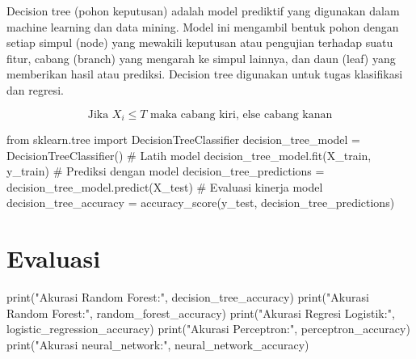 \documentclass[
  letterpaper,
]{krantz}
\makeatletter
\newenvironment{Shaded}{\begin{snugshade}}{\end{snugshade}}
\newcommand{\BuiltInTok}[1]{\textcolor[rgb]{0.00,0.23,0.31}{#1}}
\newcommand{\CommentTok}[1]{\textcolor[rgb]{0.37,0.37,0.37}{#1}}
\newcommand{\ImportTok}[1]{\textcolor[rgb]{0.00,0.46,0.62}{#1}}
\newcommand{\NormalTok}[1]{\textcolor[rgb]{0.00,0.23,0.31}{#1}}
\newcommand{\OperatorTok}[1]{\textcolor[rgb]{0.37,0.37,0.37}{#1}}
\newcommand{\StringTok}[1]{\textcolor[rgb]{0.13,0.47,0.30}{#1}}
\newenvironment{kframe}{%
\medskip{}
\setlength{\fboxsep}{.8em}
 \def\at@end@of@kframe{}%
 \ifinner\ifhmode%
  \def\at@end@of@kframe{\end{minipage}}%
  \begin{minipage}{\columnwidth}%
 \fi\fi%
 \def\FrameCommand##1{\hskip\@totalleftmargin \hskip-\fboxsep
 \colorbox{shadecolor}{##1}\hskip-\fboxsep
     \hskip-\linewidth \hskip-\@totalleftmargin \hskip\columnwidth}%
 \MakeFramed {\advance\hsize-\width
   \@totalleftmargin\z@ \linewidth\hsize
   \@setminipage}}%
 {\par\unskip\endMakeFramed%
 \at@end@of@kframe}
\renewenvironment{Shaded}{\begin{kframe}}{\end{kframe}}
\makeatother
\begin{document}

Decision tree (pohon keputusan) adalah model prediktif yang digunakan
dalam machine learning dan data mining. Model ini mengambil bentuk pohon
dengan setiap simpul (node) yang mewakili keputusan atau pengujian
terhadap suatu fitur, cabang (branch) yang mengarah ke simpul lainnya,
dan daun (leaf) yang memberikan hasil atau prediksi. Decision tree
digunakan untuk tugas klasifikasi dan regresi.

\[
\begin{equation}
\text{Jika } X_i \leq T \text{ maka cabang kiri, else cabang kanan}
\end{equation}
\]

\begin{Shaded}
\begin{Highlighting}[]
\ImportTok{from}\NormalTok{ sklearn.tree }\ImportTok{import}\NormalTok{ DecisionTreeClassifier}
\NormalTok{decision\_tree\_model }\OperatorTok{=}\NormalTok{ DecisionTreeClassifier()}
\CommentTok{\# Latih model}
\NormalTok{decision\_tree\_model.fit(X\_train, y\_train)}
\CommentTok{\# Prediksi dengan model}
\NormalTok{decision\_tree\_predictions }\OperatorTok{=}\NormalTok{ decision\_tree\_model.predict(X\_test)}
\CommentTok{\# Evaluasi kinerja model}
\NormalTok{decision\_tree\_accuracy }\OperatorTok{=}\NormalTok{ accuracy\_score(y\_test, decision\_tree\_predictions)}
\end{Highlighting}
\end{Shaded}


\hypertarget{evaluasi}{%
\chapter*{Evaluasi}\label{evaluasi}}


\begin{Shaded}
\begin{Highlighting}[]
\BuiltInTok{print}\NormalTok{(}\StringTok{"Akurasi Random Forest:"}\NormalTok{, decision\_tree\_accuracy)}
\BuiltInTok{print}\NormalTok{(}\StringTok{"Akurasi Random Forest:"}\NormalTok{, random\_forest\_accuracy)}
\BuiltInTok{print}\NormalTok{(}\StringTok{"Akurasi Regresi Logistik:"}\NormalTok{, logistic\_regression\_accuracy)}
\BuiltInTok{print}\NormalTok{(}\StringTok{"Akurasi Perceptron:"}\NormalTok{, perceptron\_accuracy)}
\BuiltInTok{print}\NormalTok{(}\StringTok{"Akurasi neural\_network:"}\NormalTok{, neural\_network\_accuracy)}
\end{Highlighting}
\end{Shaded}
\end{document}
